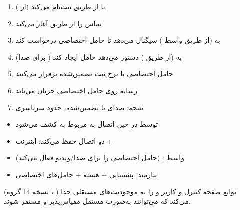 
\begin{enumerate}
\def\labelenumi{\arabic{enumi}.}
\tightlist
\item
   با  از طریق  ثبت‌نام می‌کند (از )
\item
   تماس را از طریق  آغاز می‌کند
\item
   به  (از طریق واسط ) سیگنال می‌دهد تا حامل اختصاصی درخواست کند
\item
   به  (از طریق ) دستور می‌دهد حامل  ایجاد کند ( برای صدا)
\item
   حامل اختصاصی با نرخ بیت تضمین‌شده برقرار می‌کنند
\item
  رسانه  روی حامل اختصاصی جریان می‌یابد
\item
  نتیجه: صدای  با  تضمین‌شده، حدود  سرتاسری
\end{enumerate}


\begin{itemize}
\tightlist
\item
   توسط  در حین اتصال  به  مربوط به  کشف می‌شود
\item
   دو اتصال  حفظ می‌کند:  اینترنت + 
\item
  واسط :  (حامل اختصاصی را برای صدا/\allowbreak{}ویدیو فعال می‌کند)
\item
   نیازمند: پشتیبانی  + هسته  + حامل‌های اختصاصی
\end{itemize}




\CNchained{}

 (نسخه 14 گروه ، ) توابع صفحه کنترل و کاربر  و  را به موجودیت‌های مستقلی جدا می‌کند که می‌توانند به‌صورت مستقل مقیاس‌پذیر و مستقر شوند.


